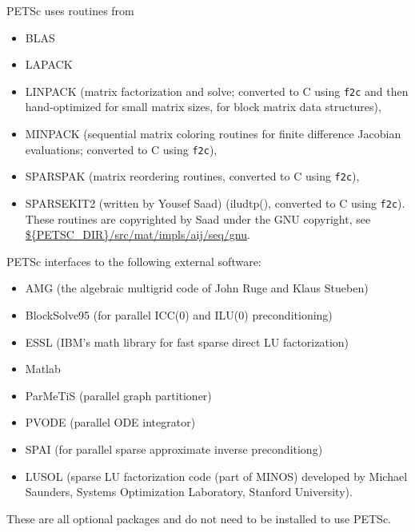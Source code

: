 \vspace{.3in}
\noindent
PETSc uses routines from 
\begin{itemize}
  \item BLAS
  \item LAPACK
  \item LINPACK      (matrix factorization and solve; converted to C using {\tt f2c} and then 
                      hand-optimized for small matrix sizes, for block matrix data structures),
  \item MINPACK      (sequential matrix coloring routines for finite difference Jacobian
                       evaluations; converted to C using {\tt f2c}),
  \item SPARSPAK     (matrix reordering routines, converted to C using {\tt f2c}),
  \item SPARSEKIT2 (written by Yousef Saad) (iludtp(), converted to C using {\tt f2c}). These routines 
                     are copyrighted by Saad under the GNU copyright, see \url{${PETSC_DIR}/src/mat/impls/aij/seq/gnu}.
\end{itemize}


\vspace{.3in}
\noindent
PETSc interfaces to the following external software:
\begin{itemize}
  \item AMG          (the algebraic multigrid code of John Ruge and Klaus Stueben)
  \item BlockSolve95 (for parallel ICC(0) and ILU(0) preconditioning)
  \item ESSL         (IBM's math library for fast sparse direct LU factorization)
  \item Matlab       
  \item ParMeTiS      (parallel graph partitioner)
  \item PVODE        (parallel ODE integrator)
  \item SPAI         (for parallel sparse approximate inverse preconditiong)
  \item LUSOL        (sparse LU factorization code (part of MINOS) developed by Michael Saunders,
                      Systems Optimization Laboratory, Stanford University).
\end{itemize}
These are all optional packages and do not need to be installed to use PETSc.



